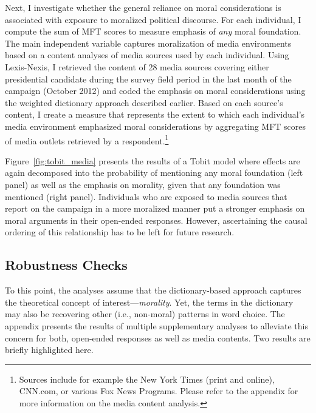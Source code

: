 \documentclass[12pt]{article}
\begin{document}
Next, I investigate whether the general reliance on moral considerations is associated with exposure to moralized political discourse. For each individual, I compute the sum of MFT scores to measure emphasis of \textit{any} moral foundation. The main independent variable captures moralization of media environments based on a content analyses of media sources used by each individual. Using Lexis-Nexis, I retrieved the content of 28 media sources covering either presidential candidate during the survey field period in the last month of the campaign (October 2012) and coded the emphasis on moral considerations using the weighted dictionary approach described earlier. Based on each source's content, I create a measure that represents the extent to which each individual's media environment emphasized moral considerations by aggregating MFT scores of media outlets retrieved by a respondent.\footnote{Sources include for example the New York Times (print and online), CNN.com, or various Fox News Programs. Please refer to the appendix for more information on the media content analysis.}

Figure~\ref{fig:tobit_media} presents the results of a Tobit model where effects are again decomposed into the probability of mentioning any moral foundation (left panel) as well as the emphasis on morality, given that any foundation was mentioned (right panel). Individuals who are exposed to media sources that report on the campaign in a more moralized manner put a stronger emphasis on moral arguments in their open-ended responses. However, ascertaining the causal ordering of this relationship has to be left for future research. 



\subsection*{Robustness Checks}

To this point, the analyses assume that the dictionary-based approach captures the theoretical concept of interest---\textit{morality}. Yet, the terms in the dictionary may also be recovering other (i.e., non-moral) patterns in word choice. The appendix presents the results of multiple supplementary analyses to alleviate this concern for both, open-ended responses as well as media contents. Two results are briefly highlighted here.
\end{document}
